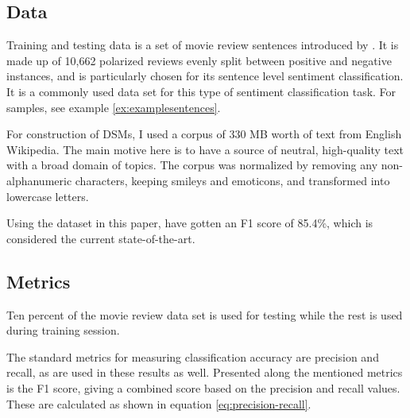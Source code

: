 \subsection{Data}\label{method-data}

Training and testing data is a set of movie review sentences introduced by \textcite{Pang2005Seeing}. It is made up of 10,662 polarized reviews evenly split between positive and negative instances, and is particularly chosen for its sentence level sentiment classification. It is a commonly used data set for this type of sentiment classification task. For samples, see example \ref{ex:examplesentences}.


For construction of DSMs, I used a corpus of 330 MB worth of text from English Wikipedia. The main motive here is to have a source of neutral, high-quality text with a broad domain of topics. The corpus was normalized by removing any non-alphanumeric characters, keeping smileys and emoticons, and transformed into lowercase letters.

Using the dataset in this paper, \textcite{Socher2013Recursive} have gotten an F1 score of 85.4\%, which is considered the current state-of-the-art.

\subsection{Metrics}\label{method-evaluation}

Ten percent of the movie review data set is used for testing while the rest is used during  training session.

The standard metrics for measuring classification accuracy are precision and recall, as are used in these results as well. Presented along the mentioned metrics is the F1 score, giving a combined score based on the precision and recall values. These are calculated as shown in equation \ref{eq:precision-recall}.


